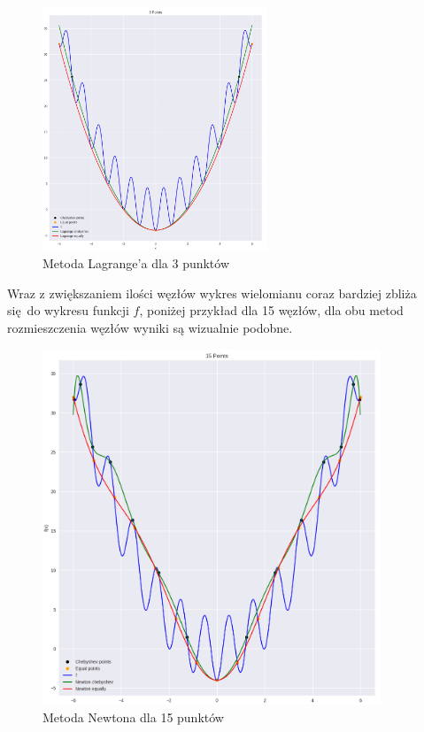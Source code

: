 \documentclass{article}
\begin{document}
\begin{figure}[H]
    \centering
    \includegraphics[width=0.6\textwidth]{img/lagr_3.png}
    \caption{Metoda Lagrange'a dla 3 punktów}
\end{figure}

Wraz z zwiększaniem ilości węzłów wykres wielomianu coraz bardziej zbliża się do wykresu funkcji $f$, 
poniżej przykład dla 15 węzłów, dla obu metod rozmieszczenia węzłów wyniki są wizualnie podobne.

\begin{figure}[H]
    \centering
    \includegraphics[width=0.9\textwidth]{img/newt_15.png}
    \caption{Metoda Newtona dla 15 punktów}
\end{figure}
\end{document}

